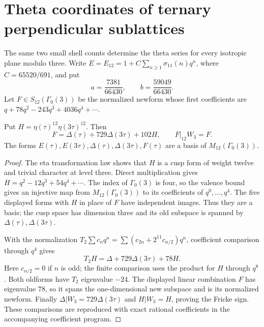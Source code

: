 \section{Theta coordinates of ternary perpendicular sublattices}
The same two small shell counts determine the theta series for every
isotropic plane modulo three.
Write $E=E_{12}=1+C\sum_{n\ge1}\sigma_{11}(n)q^n$, where
$C=65520/691$, and put
\[
 a=\frac{7381}{66430},\qquad b=\frac{59049}{66430}.
\]
Let $F\in S_{12}(\Gamma_0(3))$ be the normalized newform whose
first coefficients are $q+78q^2-243q^3+4036q^4+\cdots$.

\begin{lemma}\label{lem:level-three-basis}
Put $H=\eta(\tau)^{12}\eta(3\tau)^{12}$. Then
\[
 F=\Delta(\tau)+729\Delta(3\tau)+102H,
 \qquad F|_{12}W_3=F.
\]
The forms $E(\tau),E(3\tau),\Delta(\tau),\Delta(3\tau),F(\tau)$
are a basis of $M_{12}(\Gamma_0(3))$.
\end{lemma}
\begin{proof}
The eta transformation law shows that $H$ is a cusp form of weight
twelve and trivial character at level three. Direct multiplication gives
$H=q^2-12q^3+54q^4+\cdots$. The index of $\Gamma_0(3)$ is four,
so the valence bound gives an injective map from $M_{12}(\Gamma_0(3))$
to its coefficients of $q^0,\ldots,q^4$. The five displayed forms with
$H$ in place of $F$ have independent images. Thus they are a basis;
the cusp space has dimension three and its old subspace is spanned by
$\Delta(\tau),\Delta(3\tau)$.

With the normalization
$T_2\sum c_nq^n=\sum(c_{2n}+2^{11}c_{n/2})q^n$,
coefficient comparison through $q^4$ gives
\[
 T_2H=\Delta+729\Delta(3\tau)+78H.
\]
Here $c_{n/2}=0$ if $n$ is odd; the finite comparison uses the product
for $H$ through $q^8$. Both oldforms have $T_2$ eigenvalue $-24$.
The displayed linear combination $F$ has eigenvalue $78$, so it
spans the one-dimensional new subspace and is its normalized newform.
Finally $\Delta|W_3=729\Delta(3\tau)$ and $H|W_3=H$, proving
the Fricke sign. These comparisons are reproduced with exact rational
coefficients in the accompanying coefficient program.
\end{proof}

